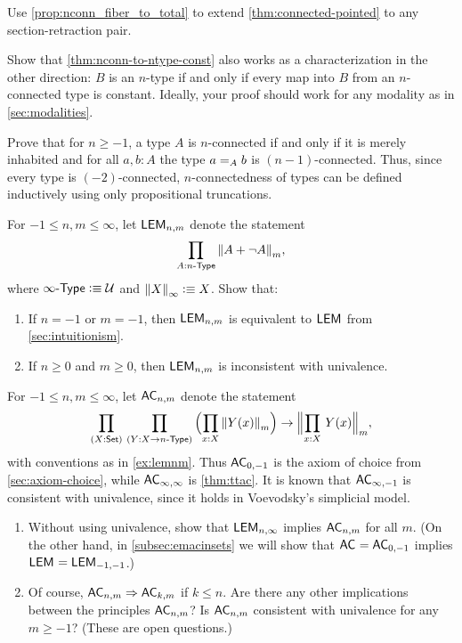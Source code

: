 \begin{ex}
  Use \autoref{prop:nconn_fiber_to_total} to extend \autoref{thm:connected-pointed} to any section-retraction pair.
\end{ex}

\begin{ex}\label{ex:ntype-from-nconn-const}
  Show that \autoref{thm:nconn-to-ntype-const} also works as a characterization in the other direction: $B$ is an $n$-type if and only if every map into $B$ from an $n$-con\-nect\-ed type is constant.
  Ideally, your proof should work for any modality as in \autoref{sec:modalities}.
\end{ex}

\begin{ex}\label{ex:connectivity-inductively}
  Prove that for $n\ge -1$, a type $A$ is $n$-connected if and only if it is merely inhabited and for all $a,b:A$ the type $\id[A]ab$ is $(n-1)$-connected.
  Thus, since every type is $(-2)$-connected, $n$-connectedness of types can be defined inductively using only propositional truncations.
\end{ex}

\begin{ex}\label{ex:lemnm}
  For $-1\le n,m \le\infty$, let $\LEM{n,m}$ denote the statement
  \[ \prd{A:\ntype{n}} \trunc m{A + \neg A},\]
  where $\ntype{\infty} \defeq \type$ and $\trunc{\infty}{X}\defeq X$.
  Show that:
  \begin{enumerate}
  \item If $n=-1$ or $m=-1$, then $\LEM{n,m}$ is equivalent to $\LEM{}$ from \autoref{sec:intuitionism}.
  \item If $n\ge 0$ and $m\ge 0$, then $\LEM{n,m}$ is inconsistent with univalence.
  \end{enumerate}
\end{ex}

\begin{ex}\label{ex:acnm}
  For $-1\le n,m\le\infty$, let $\choice{n,m}$ denote the statement
  \[ \prd{X:\set}{Y:X\to\ntype{n}}
  \Parens{\prd{x:X} \trunc m{Y(x)}}
  \to
  \Trunc m{\prd{x:X} Y(x)},
  \]
  with conventions as in \autoref{ex:lemnm}.
  Thus $\choice{0,-1}$ is the axiom of choice from \autoref{sec:axiom-choice}, while $\choice{\infty,\infty}$ is \autoref{thm:ttac}.
  It is known that $\choice{\infty,-1}$ is consistent with univalence, since it holds in Voevodsky's simplicial model.
  \begin{enumerate}
  \item Without using univalence, show that $\LEM{n,\infty}$ implies $\choice{n,m}$ for all $m$.
    (On the other hand, in \autoref{subsec:emacinsets} we will show that $\choice{}=\choice{0,-1}$ implies $\LEM{}=\LEM{-1,-1}$.)
  \item Of course, $\choice{n,m}\Rightarrow \choice{k,m}$ if $k\le n$.
    Are there any other implications between the principles $\choice{n,m}$?
    Is $\choice{n,m}$ consistent with univalence for any $m\ge -1$?
    (These are open questions.)
  \end{enumerate}
\end{ex}

